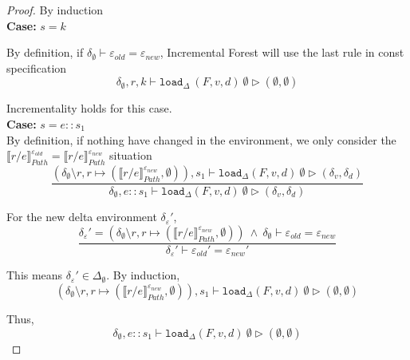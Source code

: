 \documentclass[10pt,twoside,a4paper]{article}
\theoremstyle{theorem}
\theoremstyle{lemma}
\theoremstyle{property}
\theoremstyle{definition}
\theoremstyle{assumption}
\begin{document}
\begin{proof}
	By induction\\

	\textbf{Case: } $s = k$
		
		By definition, if $\delta_{\emptyset} \vdash \varepsilon_{old} = \varepsilon_{new}$, Incremental Forest will use the last rule in const specification
		\begin{displaymath}
			\delta_{\emptyset}, r, k \vdash \mathtt{load}_\Delta~ (F,v,d)~ \emptyset \rhd (\emptyset, \emptyset)
		\end{displaymath}

		Incrementality holds for this case.\\

	\textbf{Case: } $s = e::s_1$\\
	
		By definition, if nothing have changed in the environment, we only consider the $\llbracket r/e \rrbracket^{\varepsilon_{old}}_{Path} = \llbracket r/e \rrbracket^{\varepsilon_{new}}_{Path}$ situation
		\begin{displaymath}
		\frac
		{(\delta_{\emptyset} \setminus r, r \mapsto (\llbracket r/e \rrbracket^{\varepsilon_{new}}_{Path}, \emptyset)) , s_1 \vdash \mathtt{load}_\Delta (F,v,d)~ \emptyset \rhd (\delta_v,\delta_d)}
		{\delta_{\emptyset}, e::s_1 \vdash \mathtt{load}_\Delta (F,v,d)~ \emptyset \rhd (\delta_v,\delta_d)}
		\end{displaymath}

		For the new delta environment $\delta_\varepsilon'$,
		\begin{displaymath}
		\frac{
			\delta_\varepsilon' = (\delta_{\emptyset} \setminus r, r \mapsto (\llbracket r/e \rrbracket^{\varepsilon_{new}}_{Path}, \emptyset)) 
			~\wedge~ \delta_{\emptyset} \vdash \varepsilon_{old} = \varepsilon_{new}
		}
		{	\delta_\varepsilon' \vdash \varepsilon_{old}' = \varepsilon_{new}' }
		\end{displaymath}

		This means $\delta_\varepsilon' \in \Delta_{\emptyset}$. By induction,
		\begin{displaymath}
		(\delta_{\emptyset} \setminus r, r \mapsto (\llbracket r/e \rrbracket^{\varepsilon_{new}}_{Path}, \emptyset)) , s_1 \vdash \mathtt{load}_\Delta (F,v,d)~ \emptyset \rhd (\emptyset,\emptyset)
		\end{displaymath}

		Thus, 
		\begin{displaymath}
		\delta_{\emptyset}, e::s_1 \vdash \mathtt{load}_\Delta (F,v,d)~ \emptyset \rhd (\emptyset,\emptyset)
		\end{displaymath}
		

\end{proof}
\end{document}
